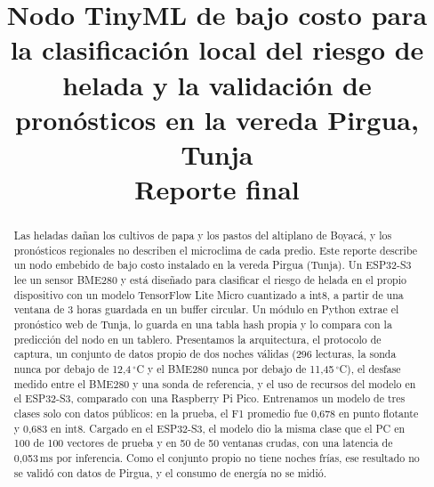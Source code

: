 \documentclass[conference]{IEEEtran}
\begin{document}
\title{Nodo TinyML de bajo costo para la clasificaci\'on local del riesgo de helada y la validaci\'on de pron\'osticos en la vereda Pirgua, Tunja\\
{\large Reporte final}}

\author{
\and
{}
\and
{}
}

\maketitle

\begin{abstract}
Las heladas da\~nan los cultivos de papa y los pastos del altiplano de Boyac\'a, y los pron\'osticos regionales no describen el microclima de cada predio. Este reporte describe un nodo embebido de bajo costo instalado en la vereda Pirgua (Tunja). Un ESP32-S3 lee un sensor BME280 y est\'a dise\~nado para clasificar el riesgo de helada en el propio dispositivo con un modelo TensorFlow Lite Micro cuantizado a int8, a partir de una ventana de 3 horas guardada en un buffer circular. Un m\'odulo en Python extrae el pron\'ostico web de Tunja, lo guarda en una tabla hash propia y lo compara con la predicci\'on del nodo en un tablero. Presentamos la arquitectura, el protocolo de captura, un conjunto de datos propio de dos noches v\'alidas (296 lecturas, la sonda nunca por debajo de 12,4\,$^\circ$C y el BME280 nunca por debajo de 11,45\,$^\circ$C), el desfase medido entre el BME280 y una sonda de referencia, y el uso de recursos del modelo en el ESP32-S3, comparado con una Raspberry Pi Pico. Entrenamos un modelo de tres clases solo con datos p\'ublicos: en la prueba, el F1 promedio fue 0,678 en punto flotante y 0,683 en int8. Cargado en el ESP32-S3, el modelo dio la misma clase que el PC en 100 de 100 vectores de prueba y en 50 de 50 ventanas crudas, con una latencia de 0,053\,ms por inferencia. Como el conjunto propio no tiene noches fr\'ias, ese resultado no se valid\'o con datos de Pirgua, y el consumo de energ\'ia no se midi\'o.
\end{abstract}
\end{document}
